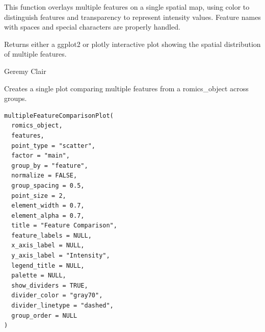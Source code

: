 \documentclass[a4paper]{book}
\begin{document}
%
\begin{Details}
This function overlays multiple features on a single spatial map, using color to distinguish features and transparency to represent intensity values. Feature names with spaces and special characters are properly handled.
\end{Details}
%
\begin{Value}
Returns either a ggplot2 or plotly interactive plot showing the spatial distribution of multiple features.
\end{Value}
%
\begin{Author}
Geremy Clair
\end{Author}
%
\begin{Description}
Creates a single plot comparing multiple features from a romics\_object across groups.
\end{Description}
%
\begin{Usage}
\begin{verbatim}
multipleFeatureComparisonPlot(
  romics_object,
  features,
  point_type = "scatter",
  factor = "main",
  group_by = "feature",
  normalize = FALSE,
  group_spacing = 0.5,
  point_size = 2,
  element_width = 0.7,
  element_alpha = 0.7,
  title = "Feature Comparison",
  feature_labels = NULL,
  x_axis_label = NULL,
  y_axis_label = "Intensity",
  legend_title = NULL,
  palette = NULL,
  show_dividers = TRUE,
  divider_color = "gray70",
  divider_linetype = "dashed",
  group_order = NULL
)
\end{verbatim}
\end{Usage}
%
\end{document}
